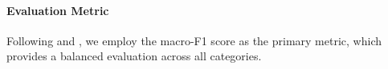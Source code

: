 

\paragraph{Evaluation Metric}
Following \cite{pan2023fact} and \cite{wang2023explainable}, we employ the macro-F1 score as the primary metric, which provides a balanced evaluation across all categories.

